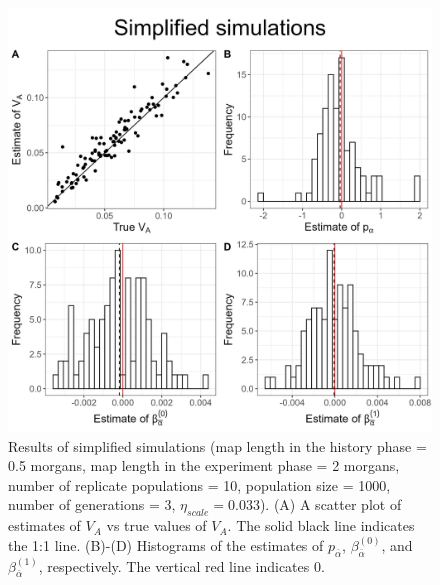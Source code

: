 \documentclass[12pt]{article}
\begin{document}
\begin{bibunit}
\begin{figure}[H]
\includegraphics[scale = 0.15]{Figures/Fig1.jpg}
\caption{Results of simplified simulations  (map length in the history phase = 0.5 morgans, map length in the experiment phase = 2 morgans, number of replicate populations = 10, population size = 1000, number of generations = 3, $\eta_{scale} = 0.033$). (A) A scatter plot of estimates of $V_A$ vs true values of $V_A$. The solid black line indicates the 1:1 line. (B)-(D) Histograms of the estimates of $p_{\bar \alpha} $, $\beta^{(0)}_{\bar{\alpha}}$, and $\beta^{(1)}_{\bar{\alpha}}$, respectively. The vertical red line indicates 0.}
  \label{fig:Figure 1}
\end{figure}


\end{bibunit}
\end{document}
